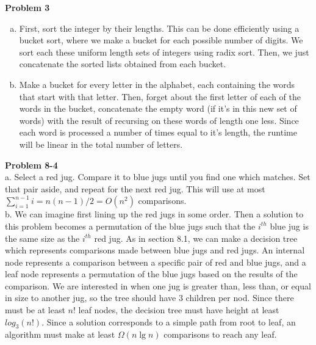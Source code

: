 \documentclass{article}
\begin{document}
\noindent\textbf{Problem 3}\\
\begin{enumerate}[a.]
\item
First, sort the integer by their lengths. This can be done efficiently using a bucket sort, where we make a bucket for each possible number of digits. We sort each these uniform length sets of integers using radix sort. Then, we just concatenate the sorted lists obtained from each bucket.

\item
Make a bucket for every letter in the alphabet, each containing the words that start with that letter. Then, forget about the first letter of each of the words in the bucket, concatenate the empty word (if it's in this new set of words) with the result of recursing on these words of length one less. Since each word is processed a number of times equal to it's length, the runtime will be linear in the total number of letters.

\end{enumerate}

\noindent\textbf{Problem 8-4}\\

a. Select a red jug.  Compare it to blue jugs until you find one which matches.  Set that pair aside, and repeat for the next red jug.  This will use at most $\sum_{i=1}^{n-1} i = n(n-1)/2 = O(n^2)$ comparisons. \\

b. We can imagine first lining up the red jugs in some order.  Then a solution to this problem becomes a permutation of the blue jugs such that the $i^{th}$ blue jug is the same size as the $i^{th}$ red jug. As in section 8.1, we can make a decision tree which represents comparisons made between blue jugs and red jugs.  An internal node represents a comparison between a specific pair of red and blue jugs, and a leaf node represents a permutation of the blue jugs based on the results of the comparison. We are interested in when one jug is greater than, less than, or equal in size to another jug, so the tree should have 3 children per nod.  Since there must be at least $n!$ leaf nodes, the decision tree must have height at least $log_3(n!)$.  Since a solution corresponds to a simple path from root to leaf, an algorithm must make at least $\Omega(n \lg n)$ comparisons to reach any leaf. \\
\end{document}
